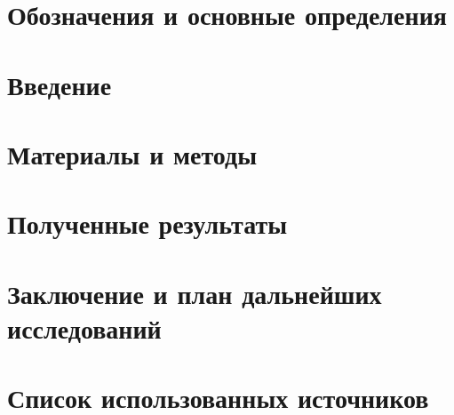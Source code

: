 \documentclass[a4paper, 12pt]{article}
\begin{document}
\maketitle
\newpage


\newpage

\tableofcontents
\newpage

\section{Обозначения и основные определения}

\newpage

\section{Введение}

\newpage

\section{Материалы и методы}

\newpage  

\section{Полученные результаты}

\newpage

\section{Заключение и план дальнейших исследований}

\newpage

\nocite{*}
\newpage

\pagestyle{bib} 
\section{Список использованных источников}
\printbibliography[heading=none]
\end{document}
